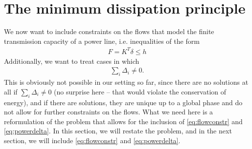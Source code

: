 \documentclass[english,twoside,a4paper,11pt]{article}
\numberwithin{equation}{section}
\begin{document}
\section{The minimum dissipation principle}

We now want to include constraints on the flows that model the finite
transmission capacity of a power line, i.e. inequalities of the form
\begin{align}
F=K^T \delta \leq h
\label{eq:flowconstr}
\end{align}
Additionally, we want to treat cases in which 
\begin{align}
\sum_i \Delta_i\neq 0.
\label{eq:powerdelta}
\end{align}
This is obviously not possible in
our setting so far, since there are no solutions at all if $\sum_i
\Delta_i\neq 0$ (no surprise here -- that would violate the conservation of
energy), and if there are solutions, they are unique up to a global
phase and do not allow for further constraints on the flows. What we
need here is a reformulation of the problem that allows for the
inclusion of \eqref{eq:flowconstr} and \eqref{eq:powerdelta}. In this
section, we will restate the problem, and in the next section, we will
include \eqref{eq:flowconstr} and \eqref{eq:powerdelta}.
\end{document}
